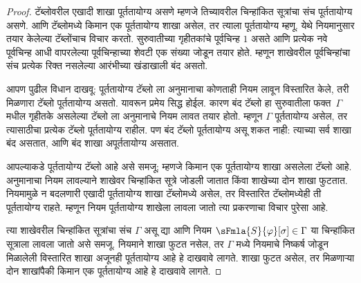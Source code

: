 \begin{proof}
टॅब्लोवरील एखादी शाखा पूर्ततायोग्य असणे म्हणजे
तिच्यावरील चिन्हांकित सूत्रांचा संच पूर्ततायोग्य असणे.
आणि टॅब्लोमध्ये किमान एक पूर्ततायोग्य शाखा
असेल, तर त्याला पूर्ततायोग्य म्हणू.
येथे नियमानुसार तयार केलेल्या टॅब्लोंचाच विचार करतो. सुरुवातीच्या
गृहीतकांचे पूर्वचिन्ह $1$ असते आणि प्रत्येक नवे पूर्वचिन्ह आधी
वापरलेल्या पूर्वचिन्हाच्या शेवटी एक संख्या जोडून तयार होते.
म्हणून शाखेवरील पूर्वचिन्हांचा संच प्रत्येक रिक्त नसलेल्या आरंभीच्या
खंडाखाली बंद असतो.

आपण पुढील विधान दाखवू: पूर्ततायोग्य टॅब्लो ला
अनुमानाचा कोणताही नियम लावून विस्तारित केले, तरी
मिळणारा टॅब्लो पूर्ततायोग्य असतो. यावरून प्रमेय
सिद्ध होईल. कारण बंद टॅब्लो हा
सुरुवातीला फक्त~$\Gamma$ मधील गृहीतके असलेल्या
टॅब्लो ला अनुमानाचे नियम लावत तयार होतो.
म्हणून $\Gamma$ पूर्ततायोग्य असेल, तर त्यासाठीचा
प्रत्येक टॅब्लो पूर्ततायोग्य राहील. पण बंद
टॅब्लो पूर्ततायोग्य असू शकत नाही: त्याच्या सर्व
शाखा बंद असतात, आणि बंद शाखा अपूर्ततायोग्य असतात.

आपल्याकडे पूर्ततायोग्य टॅब्लो आहे असे समजू;
म्हणजे किमान एक पूर्ततायोग्य शाखा असलेला टॅब्लो
आहे. अनुमानाचा
नियम लावल्याने शाखेवर चिन्हांकित सूत्रे
जोडली जातात किंवा शाखेच्या दोन शाखा फुटतात.
नियमामुळे न बदलणारी एखादी पूर्ततायोग्य शाखा
टॅब्लोमध्ये असेल, तर विस्तारित
टॅब्लोमध्येही ती पूर्ततायोग्य राहते. म्हणून
नियम पूर्ततायोग्य शाखेला लावला जातो त्या
प्रकरणाचा विचार पुरेसा आहे.

त्या शाखेवरील चिन्हांकित सूत्रांचा संच
$\Gamma$ असू द्या आणि नियम
$\sFmla{S}{\varphi}[\sigma] \in \Gamma$ या
चिन्हांकित सूत्राला लावला जातो असे समजू.
नियमाने शाखा फुटत नसेल, तर $\Gamma$ मध्ये
नियमाचे निष्कर्ष जोडून मिळालेली विस्तारित
शाखा अजूनही पूर्ततायोग्य आहे हे दाखवावे लागते.
शाखा फुटत असेल, तर मिळणाऱ्या दोन शाखांपैकी
किमान एक पूर्ततायोग्य आहे हे दाखवावे लागते.


\end{proof}

